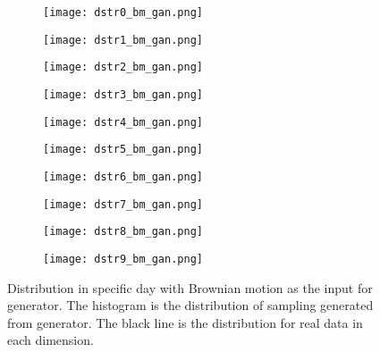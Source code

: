 \documentclass{article}
\begin{document}
	\begin{figure}
		\begin{subfigure}[b]{0.3\textwidth}
			\texttt{[image: dstr0\_bm\_gan.png]}
		\end{subfigure}
		\hfill
		\begin{subfigure}[b]{0.3\textwidth}
			\texttt{[image: dstr1\_bm\_gan.png]}
			
		\end{subfigure}
		\hfill
		\begin{subfigure}[b]{0.3\textwidth}
			\texttt{[image: dstr2\_bm\_gan.png]}
		\end{subfigure}
		
		\begin{subfigure}[b]{0.3\textwidth}
			\texttt{[image: dstr3\_bm\_gan.png]}
			
		\end{subfigure}
		\hfill
		\begin{subfigure}[b]{0.3\textwidth}
			\texttt{[image: dstr4\_bm\_gan.png]}
		\end{subfigure}
		\hfill
		\begin{subfigure}[b]{0.3\textwidth}
			\texttt{[image: dstr5\_bm\_gan.png]}
		\end{subfigure}
		
		\begin{subfigure}[b]{0.3\textwidth}
			\texttt{[image: dstr6\_bm\_gan.png]}
		\end{subfigure}
		\hfill
		\begin{subfigure}[b]{0.3\textwidth}
			\texttt{[image: dstr7\_bm\_gan.png]}
		\end{subfigure}
		\hfill
		\begin{subfigure}[b]{0.3\textwidth}
			\texttt{[image: dstr8\_bm\_gan.png]}
		\end{subfigure}
		\begin{subfigure}[b]{0.3\textwidth}
			\texttt{[image: dstr9\_bm\_gan.png]}
		\end{subfigure}
		\caption{Distribution in specific day with Brownian motion as the input for generator. The histogram is the distribution of sampling generated from generator. The black line is the distribution for real data in each dimension.}
		\label{fig:dstr_bm}
	\end{figure}
\end{document}
